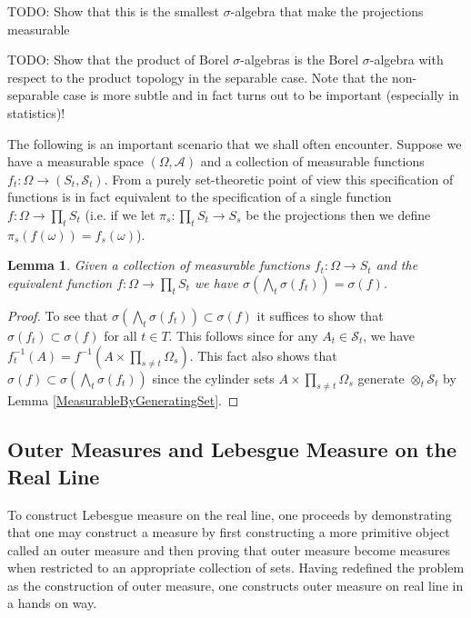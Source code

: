 \documentclass{amsart}
\newtheorem{lem}[thm]{Lemma}
\theoremstyle{remark}
\theoremstyle{definition}
\begin{document}
TODO: Show that this is the smallest $\sigma$-algebra that make the
projections measurable

TODO: Show that the product of Borel $\sigma$-algebras is the Borel
$\sigma$-algebra with respect to the product topology in the separable
case.  Note that the non-separable case is more subtle and in fact
turns out to be important (especially in statistics)!

The following is an important scenario that we shall often encounter.
Suppose we have a measurable space $(\Omega, \mathcal{A})$ and a
collection of measurable functions $f_t : \Omega \to (S_t,
\mathcal{S}_t)$.  From a purely set-theoretic point of view this
specification of functions is in fact
equivalent to the specification of a single function $f : \Omega \to
\prod_t S_t$ (i.e. if we let $\pi_s : \prod_t S_t \to S_s$ be the
projections then we define $\pi_s(f(\omega)) = f_s(\omega)$).  

\begin{lem}Given a collection of measurable functions $f_t : \Omega
  \to S_t$ and the equivalent function $f : \Omega \to \prod_t S_t$ we
  have $\sigma(\bigwedge_t \sigma(f_t)) = \sigma(f)$.
\end{lem}
\begin{proof}
To see that $\sigma(\bigwedge_t \sigma(f_t)) \subset \sigma(f)$ it
suffices to show that $\sigma(f_t) \subset \sigma(f)$ for all $t \in
T$.  This follows since for any $A_t \in \mathcal{S}_t$, we have
$f_t^{-1}(A) = f^{-1}(A \times  \prod_{s \neq t} \Omega_s)$.  This
fact also shows that $\sigma(f) \subset \sigma(\bigwedge_t
\sigma(f_t))$ since the cylinder sets $A \times  \prod_{s \neq t}
\Omega_s$ generate $\otimes_t \mathcal{S}_t$ by Lemma \ref{MeasurableByGeneratingSet}.
\end{proof}

\subsection{Outer Measures and Lebesgue Measure on the Real Line}
To construct Lebesgue measure on the real line, one proceeds by
demonstrating that one may construct a measure by first constructing a more
primitive object called an outer measure and then proving that outer
measure become measures when restricted to an appropriate collection
of sets.  Having redefined the problem as the construction of outer
measure, one constructs outer measure on real line in a hands on way.
\end{document}
